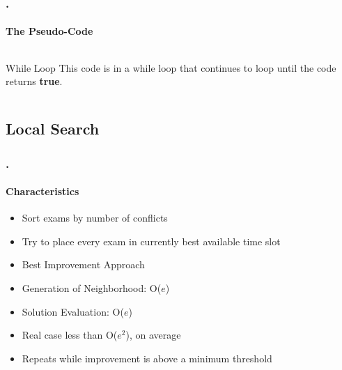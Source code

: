 \documentclass{beamer}
\begin{document}
	\begin{frame}
	\frametitle{\thesection.\thesubsection \ \insertsubsection}
	\framesubtitle{The Pseudo-Code}
	\begin{columns}[onlytextwidth]
\begin{block}{While Loop}
	This code is in a while loop that continues to loop until the code returns \textbf{true}.
\end{block}
\end{columns}
	\end{frame}

	

   \subsection{Local Search}
   
   \begin{frame}
   \frametitle{\thesection.\thesubsection \ \insertsubsection}
   \framesubtitle{Characteristics}
   	
   \begin{itemize}
   	\item Sort exams by number of conflicts
   	\item Try to place every exam in currently best available time slot
   	\item Best Improvement Approach
   	\item Generation of Neighborhood: O($e$)
   	\item Solution Evaluation: O($e$)
   	\item Real case less than O($e^2$), on average
   	\item Repeats while improvement is above a minimum threshold
   \end{itemize}
 
\end{frame}
\end{document}

